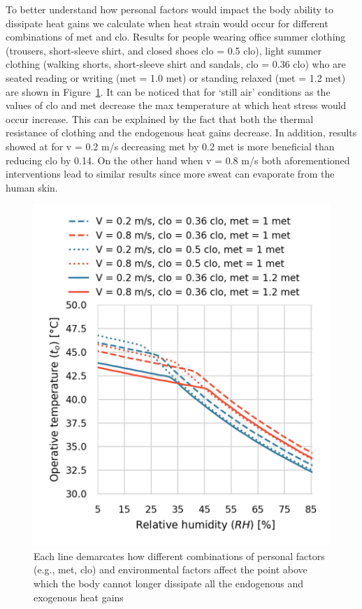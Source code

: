 To better understand how personal factors would impact the body ability to dissipate heat gains we calculate when heat strain would occur for different combinations of \ac{met} and \ac{clo}.
Results for people wearing office summer clothing (trousers, short-sleeve shirt, and closed shoes \acs{clo} = 0.5 clo), light summer clothing (walking shorts, short-sleeve shirt and sandals, \acs{clo} = 0.36 clo) who are seated reading or writing (\ac{met} = 1.0 met) or standing relaxed (\ac{met} = 1.2 met) are shown in Figure~\ref{fig:met_clo}.
It can be noticed that for `still air' conditions as the values of \ac{clo} and \ac{met} decrease the max temperature at which heat stress would occur increase.
This can be explained by the fact that both the thermal resistance of clothing and the endogenous heat gains decrease.
In addition, results showed at for \ac{v} = 0.2 m/s decreasing \ac{met} by 0.2 met is more beneficial than reducing \ac{clo} by 0.14.
On the other hand when \ac{v} = 0.8 m/s both aforementioned interventions lead to similar results since more sweat can evaporate from the human skin.

\begin{figure}[b!]
    \centering
    \includegraphics[width=\textwidth]{figures/met_clo.png}
    \caption{Each line demarcates how different combinations of personal factors (e.g., \ac{met}, \ac{clo}) and environmental factors affect the point above which the body cannot longer dissipate all the endogenous and exogenous heat gains}
    \label{fig:met_clo}
\end{figure}

